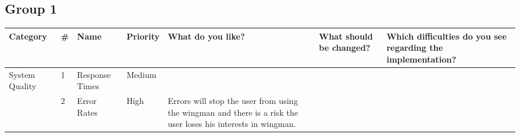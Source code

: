 \documentclass[
	english,
	ruledheaders=section,%
	class=report,%
	thesis={type=bachelor},%
	accentcolor=1b,%
	custommargins=true,%
	marginpar=false,%
	parskip=half-,%
	fontsize=11pt,%
	DIV=14,
]{tudapub}
\begin{document}
\subsection*{Group 1}
\begin{sideways}
    \begin{minipage}{\textheight}
        \centering
        \small 
        \label{tab:system_quality}
        \begin{tabularx}{\linewidth}{p{2.2cm} l >{\RaggedRight\arraybackslash}X l >{\RaggedRight\arraybackslash}X >{\RaggedRight\arraybackslash}X >{\RaggedRight\arraybackslash}X}
            \toprule
            \textbf{Category} & \textbf{\#} & \textbf{Name} & \textbf{Priority} & \textbf{What do you like?} & \textbf{What should be changed?} & \textbf{Which difficulties do you see regarding the implementation?} \\
            \midrule
            
            \multirow{2}{=}{System Quality} 
            & 1 & Response Times & Medium & & & \\
            \cmidrule(l){2-7}
            & 2 & Error Rates & High & Errors will stop the user from using the wingman and there is a risk the user loses his interests in wingman. & & \\
            \bottomrule
        \end{tabularx}
    \end{minipage}
\end{sideways}
\end{document}
